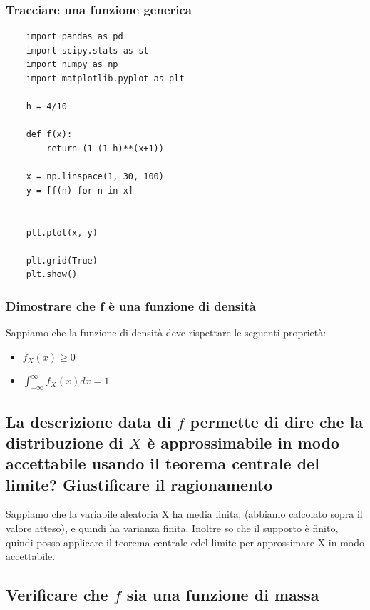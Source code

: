 \documentclass{article}
\begin{document}
\subsubsection*{Tracciare una funzione generica}

\begin{lstlisting}
    import pandas as pd
    import scipy.stats as st
    import numpy as np
    import matplotlib.pyplot as plt

    h = 4/10

    def f(x):
        return (1-(1-h)**(x+1))

    x = np.linspace(1, 30, 100)
    y = [f(n) for n in x]


    plt.plot(x, y)

    plt.grid(True)
    plt.show()
\end{lstlisting}

\pagebreak

\subsubsection*{Dimostrare che f è una funzione di densità}


Sappiamo che la funzione di densità deve rispettare le seguenti proprietà:

\begin{itemize}
    \item $f_X(x) \geq 0$
    \item $\int_{-\infty}^{\infty}f_X(x) dx = 1$

\end{itemize}

\subsection*{La descrizione data di $f$ permette di dire che la distribuzione di $X$ è approssimabile in modo accettabile usando il teorema centrale del limite? Giustificare il ragionamento}

Sappiamo che la variabile aleatoria X ha media finita, (abbiamo calcolato sopra il valore atteso), e quindi ha varianza finita. Inoltre so che il supporto è finito, quindi posso applicare il teorema centrale edel limite per approssimare X in modo accettabile.

\subsection*{Verificare che $f$ sia una funzione di massa}
\end{document}
